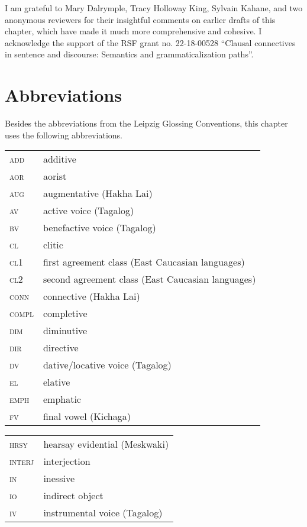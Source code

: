\documentclass[output=paper]{../langscibook}
\begin{document}
I am grateful to Mary Dalrymple, Tracy Holloway King, Sylvain Kahane, and two anonymous reviewers for their insightful comments on earlier drafts of this chapter, which have made it much more comprehensive and cohesive.  I acknowledge the support of the RSF grant no. 22-18-00528 ``Clausal connectives in sentence and discourse: Semantics and grammaticalization paths''.

\section*{Abbreviations}

Besides the abbreviations from the Leipzig Glossing Conventions, this
chapter uses the following abbreviations.\medskip

\noindent\begin{tabularx}{.45\textwidth}{lQ}
\textsc{add}& additive\\
\textsc{aor}& aorist\\
\textsc{aug}& augmentative (Hakha Lai)\\
\textsc{av}& active voice (Tagalog)\\
\textsc{bv}& benefactive voice (Tagalog)\\
\textsc{cl}& clitic \\
\textsc{cl1}& first agreement class (East Caucasian languages)\\
\textsc{cl2}& second agreement class (East Caucasian languages)\\
\textsc{conn}& connective (Hakha Lai)\\
\textsc{compl}& completive\\
\textsc{dim}& diminutive\\
\textsc{dir}& directive\\
\textsc{dv}& dative/locative voice (Tagalog)\\
\textsc{el}& elative\\
\textsc{emph}& emphatic\\
\textsc{fv}& final vowel (Kichaga)\\
\end{tabularx}\noindent\begin{tabularx}{.45\textwidth}{lQ}
\textsc{hrsy}& hearsay evidential (Meskwaki)\\
\textsc{interj}& interjection\\
\textsc{in}& inessive\\
\textsc{io}& indirect object\\
\textsc{iv}& instrumental voice (Tagalog)\\

\end{tabularx}
\end{document}
